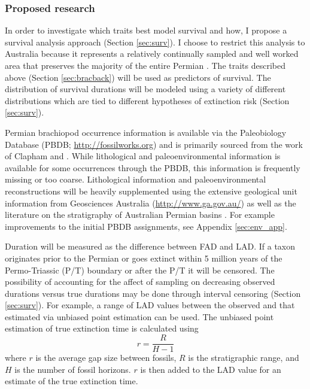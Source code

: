 \documentclass[12pt,letterpaper]{article}
\begin{document}
\subsubsection{Proposed research} \label{sec:bracsurvmeth}
In order to investigate which traits best model survival and how, I propose a survival analysis approach (Section \ref{sec:surv}). I choose to restrict this analysis to Australia because it represents a relatively continually sampled and well worked area that preserves the majority of the entire Permian \citep{Fielding2008,Birgenheier2010,Clapham2012,Clapham2008a,Waterhouse1987,Archbold1995}. The traits described above (Section \ref{sec:bracback}) will be used as predictors of survival. The distribution of survival durations will be modeled using a variety of different distributions which are tied to different hypotheses of extinction risk (Section \ref{sec:surv}).

Permian brachiopod occurrence information is available via the Paleobiology Database (PBDB; \url{http://fossilworks.org}) and is primarily sourced from the work of Clapham \citep{Clapham2006,Clapham2008a,Clapham2007a,Clapham2012,Clapham2007} and \citet{Waterhouse1987}. While lithological and paleoenvironmental information is available for some occurrences through the PBDB, this information is frequently missing or too coarse. Lithological information and paleoenvironmental reconstructions will be heavily supplemented using the extensive geological unit information from Geosciences Australia (\url{http://www.ga.gov.au/}) as well as the literature on the stratigraphy of Australian Permian basins \citep{Fielding2008a,Fielding2008,Fielding2006,Fielding2010,Birgenheier2010,Waterhouse1987,Waterhouse2013,Frank2008,Jones2006,Percival2012}. For example improvements to the initial PBDB assignments, see Appendix \ref{sec:env_app}.

Duration will be measured as the difference between FAD and LAD. If a taxon originates prior to the Permian or goes extinct within 5 million years of the Permo-Triassic (P/T) boundary or after the P/T it will be censored. The possibility of accounting for the affect of sampling on decreasing observed durations versus true durations may be done through interval censoring (Section \ref{sec:surv}). For example, a range of LAD values between the observed and that estimated via unbiased point estimation \citep{Strauss1989,Alvarez1983a} can be used. The unbiased point estimation of true extinction time is calculated using
\begin{equation}
  r = \frac{R}{H - 1}
  \label{eq:stratest}
\end{equation}
where \(r\) is the average gap size between fossils, \(R\) is the stratigraphic range, and \(H\) is the number of fossil horizons. \(r\) is then added to the LAD value for an estimate of the true extinction time.
\end{document}
